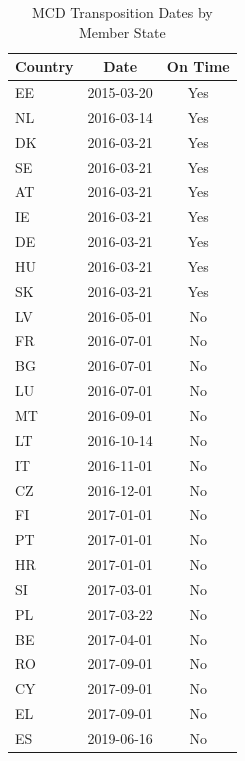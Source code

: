 \begin{table}[!h]
\centering
\caption{\label{tab:transposition}MCD Transposition Dates by Member State}
\centering
\begin{tabular}[t]{lcc}
\toprule
Country & Date & On Time\\
\midrule
EE & 2015-03-20 & Yes\\
NL & 2016-03-14 & Yes\\
DK & 2016-03-21 & Yes\\
SE & 2016-03-21 & Yes\\
AT & 2016-03-21 & Yes\\
\addlinespace
IE & 2016-03-21 & Yes\\
DE & 2016-03-21 & Yes\\
HU & 2016-03-21 & Yes\\
SK & 2016-03-21 & Yes\\
LV & 2016-05-01 & No\\
\addlinespace
FR & 2016-07-01 & No\\
BG & 2016-07-01 & No\\
LU & 2016-07-01 & No\\
MT & 2016-09-01 & No\\
LT & 2016-10-14 & No\\
\addlinespace
IT & 2016-11-01 & No\\
CZ & 2016-12-01 & No\\
FI & 2017-01-01 & No\\
PT & 2017-01-01 & No\\
HR & 2017-01-01 & No\\
\addlinespace
SI & 2017-03-01 & No\\
PL & 2017-03-22 & No\\
BE & 2017-04-01 & No\\
RO & 2017-09-01 & No\\
CY & 2017-09-01 & No\\
\addlinespace
EL & 2017-09-01 & No\\
ES & 2019-06-16 & No\\
\bottomrule
\end{tabular}
\end{table}
